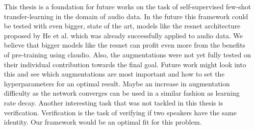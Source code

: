 This thesis is a foundation for future works on the task of self-supervised few-shot transfer-learning in the domain of audio data. In the future this framework could be tested with even bigger, state of the art, models like the \gls{resnet} architecture proposed by He et al. \cite{he2015deep} which was already successfully applied to audio data. We believe that bigger models like the \gls{resnet} can profit even more from the benefits of pre-training using \gls{claudio}. Also, the augmentations were not yet fully tested on their individual contribution towards the final goal. Future work might look into this and see which augmentations are most important and how to set the hyperparameters for an optimal result. Maybe an increase in augmentation difficulty as the network converges can be used in a similar fashion as learning rate decay. Another interesting task that was not tackled in this thesis is verification. Verification is the task of verifying if two speakers have the same identity. Our framework would be an optimal fit for this problem.
